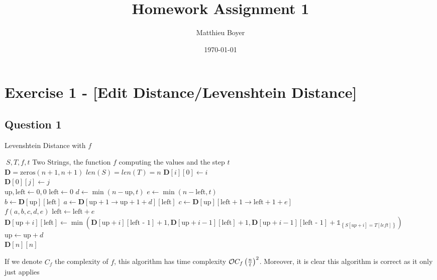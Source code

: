 \documentclass{cours}
\title{Homework Assignment 1}
\author{Matthieu Boyer}
\date{\today}
\begin{document}
\section{Exercise 1 - [Edit Distance/Levenshtein Distance]}
\subsection{Question 1}
\begin{algorithm}
    \caption{Levenshtein Distance with $f$}
    \begin{algorithmic}
        \Input $\ S, T, f, t$ \Comment Two Strings, the function $f$ computing the values and the step $t$
        \EndInput\\
        \State $\mathbf{D} = \text{zeros}(n + 1, n + 1)$ \Comment $len(S) = len(T) = n$
            \State $\mathbf{D}[i][0] \gets i$
        \EndFor\\
            \State $\mathbf{D}[0][j] \gets j$
        \EndFor\\
        \State $\text{up}, \text{left} \gets 0, 0$
            \State $\text{left} \gets 0$
                \State $d \gets \min(n-\text{up}, t)$
                \State $e \gets \min(n-\text{left}, t)$\\
                \State $b \gets \mathbf{D}[\text{up}][\text{left}]$
                \State $a \gets \mathbf{D}[\text{up} + 1 \rightarrow \text{up} + 1 + d][\text{left}]$
                \State $c \gets \mathbf{D}[\text{up}][\text{left} + 1 \rightarrow \text{left} + 1 + e]$\\
                \State $f(a, b, c, d, e)$ 
                \State $\text{left} \gets \text{left} + e$
                    \State $\mathbf{D}[\text{up} + i][\text{left}] \gets \min{\left(\mathbf{D}[\text{up} + i][\text{left - 1}] + 1, \mathbf{D}[\text{up} + i - 1][\text{left}] + 1,\mathbf{D}[\text{up} + i - 1][\text{left - 1}] + \mathds{1}_{\left\{S[up + i] = T[left]\right\}} \right)}$
                \EndFor
            \EndWhile
            \State $\text{up} \gets \text{up} + d$
        \EndWhile\\

        \Return $\mathbf{D}[n][n]$
    
    \end{algorithmic}
\end{algorithm}
\begin{proposition}
    If we denote $C_{f}$ the complexity of $f$, this algorithm has time complexity $\mathcal{O}{C_{f}\left(\frac{n}{t}\right)^{2}}$. Moreover, it is clear this algorithm is correct as it only just applies
\end{proposition}
\end{document}
